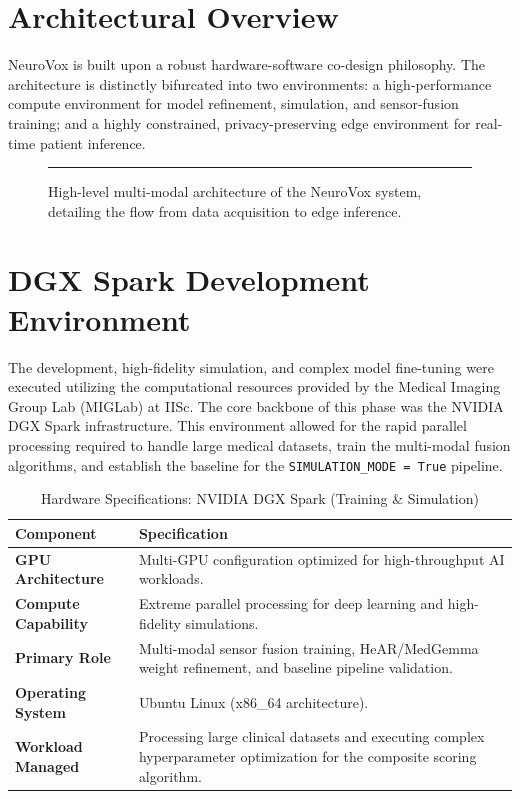 \documentclass[BTech]{iitmdiss}
\begin{document}
\section{Architectural Overview}
NeuroVox is built upon a robust hardware-software co-design philosophy. The architecture is distinctly bifurcated into two environments: a high-performance compute environment for model refinement, simulation, and sensor-fusion training; and a highly constrained, privacy-preserving edge environment for real-time patient inference. 

\begin{figure}[htbp]
    \centering
    \rule{0.8\textwidth}{6cm} %
    \caption{High-level multi-modal architecture of the NeuroVox system, detailing the flow from data acquisition to edge inference.}
    \label{fig:sys_architecture}
\end{figure}

\section{DGX Spark Development Environment}
The development, high-fidelity simulation, and complex model fine-tuning were executed utilizing the computational resources provided by the Medical Imaging Group Lab (MIGLab) at IISc. The core backbone of this phase was the NVIDIA DGX Spark infrastructure. This environment allowed for the rapid parallel processing required to handle large medical datasets, train the multi-modal fusion algorithms, and establish the baseline for the \texttt{SIMULATION\_MODE = True} pipeline.

\begin{table}[htbp]
\centering
\caption{Hardware Specifications: NVIDIA DGX Spark (Training \& Simulation)}
\label{tab:dgx_specs}
\renewcommand{\arraystretch}{1.3}
\begin{tabularx}{\textwidth}{p{4.5cm} X}
\toprule
\textbf{Component} & \textbf{Specification} \\
\midrule
\textbf{GPU Architecture} & Multi-GPU configuration optimized for high-throughput AI workloads. \\
\textbf{Compute Capability} & Extreme parallel processing for deep learning and high-fidelity simulations. \\
\textbf{Primary Role} & Multi-modal sensor fusion training, HeAR/MedGemma weight refinement, and baseline pipeline validation. \\
\textbf{Operating System} & Ubuntu Linux (x86\_64 architecture). \\
\textbf{Workload Managed} & Processing large clinical datasets and executing complex hyperparameter optimization for the composite scoring algorithm. \\
\bottomrule
\end{tabularx}
\end{table}
\end{document}
